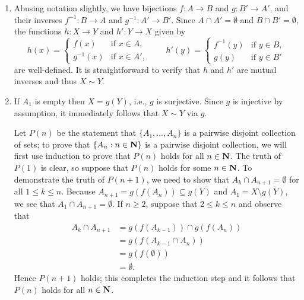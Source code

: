 \documentclass{lew98_solutions}
\begin{document}
\begin{solution}
    \begin{enumerate}
        \item Abusing notation slightly, we have bijections \( f : A \to B \) and \( g : B' \to A' \), and their inverses \( f^{-1} : B \to A \) and \( g^{-1} : A' \to B' \). Since \( A \cap A' = \emptyset \) and \( B \cap B' = \emptyset \), the functions \( h : X \to Y \) and \( h' : Y \to X \) given by
        \[
            h(x) = \begin{cases}
                f(x) & \text{if } x \in A, \\
                g^{-1}(x) & \text{if } x \in A',
            \end{cases}
            \qquad
            h'(y) = \begin{cases}
                f^{-1}(y) & \text{if } y \in B, \\
                g(y) & \text{if } y \in B'
            \end{cases}
        \]
        are well-defined. It is straightforward to verify that \( h \) and \( h' \) are mutual inverses and thus \( X \sim Y \).

        \item If \( A_1 \) is empty then \( X = g(Y) \), i.e., \( g \) is surjective. Since \( g \) is injective by assumption, it immediately follows that \( X \sim Y \) via \( g \).

        Let \( P(n) \) be the statement that \( \{ A_1, \ldots, A_n \} \) is a pairwise disjoint collection of sets; to prove that \( \{ A_n : n \in \mathbf{N} \} \) is a pairwise disjoint collection, we will first use induction to prove that \( P(n) \) holds for all \( n \in \mathbf{N} \). The truth of \( P(1) \) is clear, so suppose that \( P(n) \) holds for some \( n \in \mathbf{N} \). To demonstrate the truth of \( P(n+1) \), we need to show that \( A_k \cap A_{n+1} = \emptyset \) for all \( 1 \leq k \leq n \). Because \( A_{n+1} = g(f(A_n)) \subseteq g(Y) \) and \( A_1 = X \setminus g(Y) \), we see that \( A_1 \cap A_{n+1} = \emptyset \). If \( n \geq 2 \), suppose that \( 2 \leq k \leq n \) and observe that
        \begin{align*}
            A_k \cap A_{n+1} &= g(f(A_{k-1})) \cap g(f(A_n)) \\
            &= g(f(A_{k-1} \cap A_n)) \tag{\( f \) and \( g \) are injective} \\
            &= g(f(\emptyset)) \tag{induction hypothesis} \\
            &= \emptyset.
        \end{align*}
        Hence \( P(n+1) \) holds; this completes the induction step and it follows that \( P(n) \) holds for all \( n \in \mathbf{N} \).
        

\end{enumerate}
\end{solution}
\end{document}
